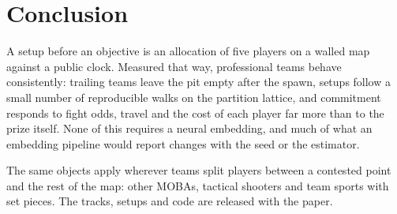 \section{Conclusion}
\label{sec:conclusion}

A setup before an objective is an allocation of five players on a walled map against a public clock.
Measured that way, professional teams behave consistently: trailing teams leave the pit empty after the spawn, setups follow a small number of reproducible walks on the partition lattice, and commitment responds to fight odds, travel and the cost of each player far more than to the prize itself.
None of this requires a neural embedding, and much of what an embedding pipeline would report changes with the seed or the estimator.

The same objects apply wherever teams split players between a contested point and the rest of the map: other MOBAs, tactical shooters and team sports with set pieces.
The tracks, setups and code are released with the paper.
